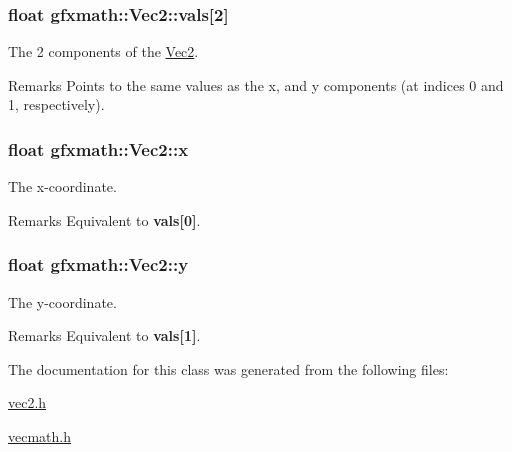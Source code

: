 \subsubsection[{vals}]{\setlength{\rightskip}{0pt plus 5cm}float gfxmath\+::\+Vec2\+::vals\mbox{[}2\mbox{]}}\label{classgfxmath_1_1_vec2_a7ea0d3fc8b8a22e4358c9dff904480ab}


The 2 components of the \hyperlink{classgfxmath_1_1_vec2}{Vec2}. 

\begin{DoxyRemark}{Remarks}
Points to the same values as the x, and y components (at indices 0 and 1, respectively). 
\end{DoxyRemark}
\hypertarget{classgfxmath_1_1_vec2_ae822579debf2a7b9aab468fbb4ce218d}{}
\subsubsection[{x}]{\setlength{\rightskip}{0pt plus 5cm}float gfxmath\+::\+Vec2\+::x}\label{classgfxmath_1_1_vec2_ae822579debf2a7b9aab468fbb4ce218d}


The x-\/coordinate. 

\begin{DoxyRemark}{Remarks}
Equivalent to {\bfseries vals\mbox{[}0\mbox{]}}. 
\end{DoxyRemark}
\hypertarget{classgfxmath_1_1_vec2_acfad5fd06cb37b0e0e5373f286e7d474}{}
\subsubsection[{y}]{\setlength{\rightskip}{0pt plus 5cm}float gfxmath\+::\+Vec2\+::y}\label{classgfxmath_1_1_vec2_acfad5fd06cb37b0e0e5373f286e7d474}


The y-\/coordinate. 

\begin{DoxyRemark}{Remarks}
Equivalent to {\bfseries vals\mbox{[}1\mbox{]}}. 
\end{DoxyRemark}


The documentation for this class was generated from the following files\+:\begin{DoxyCompactItemize}
\item 
\hyperlink{vec2_8h}{vec2.\+h}\item 
\hyperlink{vecmath_8h}{vecmath.\+h}\end{DoxyCompactItemize}
